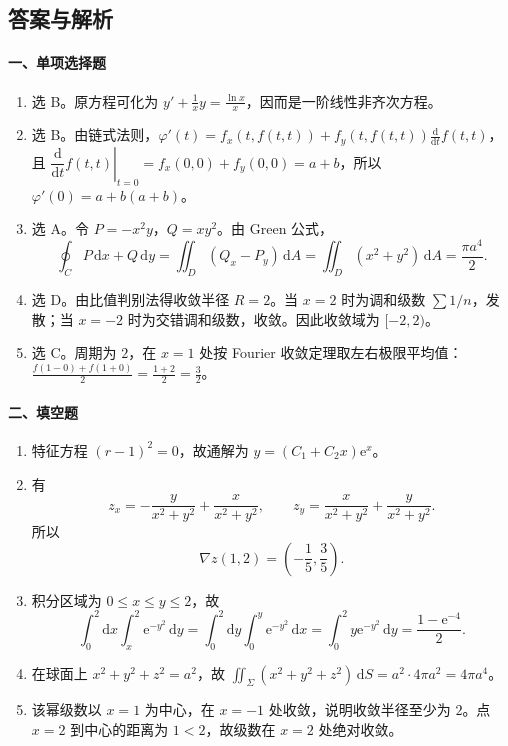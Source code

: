 \subsection{答案与解析}
\paragraph*{一、单项选择题}
\begin{enumerate}
  \item 选 B。原方程可化为 \(\displaystyle y'+\frac1x y=\frac{\ln x}{x}\)，因而是一阶线性非齐次方程。

  \item 选 B。由链式法则，\(\displaystyle \varphi'(t)=f_x(t,f(t,t))+f_y(t,f(t,t))\frac{\mathrm{d}}{\mathrm{d}t}f(t,t)\)，且 \(\left.\dfrac{\mathrm{d}}{\mathrm{d}t}f(t,t)\right|_{t=0}=f_x(0,0)+f_y(0,0)=a+b\)，所以
  \(\varphi'(0)=a+b(a+b)\)。

  \item 选 A。令 \(P=-x^2y\)，\(Q=xy^2\)。由 Green 公式，
  \[
    \oint_C P\,\mathrm{d}x+Q\,\mathrm{d}y
    =\iint_D(Q_x-P_y)\,\mathrm{d}A
    =\iint_D(x^2+y^2)\,\mathrm{d}A
    =\frac{\pi a^4}{2}.
  \]

  \item 选 D。由比值判别法得收敛半径 \(R=2\)。当 \(x=2\) 时为调和级数 \(\sum 1/n\)，发散；当 \(x=-2\) 时为交错调和级数，收敛。因此收敛域为 \([-2,2)\)。

  \item 选 C。周期为 \(2\)，在 \(x=1\) 处按 Fourier 收敛定理取左右极限平均值：\(\displaystyle \frac{f(1-0)+f(1+0)}2=\frac{1+2}{2}=\frac32\)。
\end{enumerate}

\paragraph*{二、填空题}
\begin{enumerate}
  \item 特征方程 \((r-1)^2=0\)，故通解为 \(\displaystyle y=(C_1+C_2x)\mathrm{e}^x\)。

  \item 有
  \[
    z_x=-\frac{y}{x^2+y^2}+\frac{x}{x^2+y^2},\qquad
    z_y=\frac{x}{x^2+y^2}+\frac{y}{x^2+y^2}.
  \]
  所以
  \[
    \nabla z(1,2)=\left(-\frac15,\frac35\right).
  \]

  \item 积分区域为 \(0\le x\le y\le 2\)，故
  \[
    \int_0^2\mathrm{d}x\int_x^2 \mathrm{e}^{-y^2}\,\mathrm{d}y
    =\int_0^2\mathrm{d}y\int_0^y \mathrm{e}^{-y^2}\,\mathrm{d}x
    =\int_0^2y\mathrm{e}^{-y^2}\,\mathrm{d}y
    =\frac{1-\mathrm{e}^{-4}}2.
  \]

  \item 在球面上 \(x^2+y^2+z^2=a^2\)，故 \(\displaystyle \iint_\Sigma (x^2+y^2+z^2)\,\mathrm{d}S=a^2\cdot 4\pi a^2=4\pi a^4\)。

  \item 该幂级数以 \(x=1\) 为中心，在 \(x=-1\) 处收敛，说明收敛半径至少为 \(2\)。点 \(x=2\) 到中心的距离为 \(1<2\)，故级数在 \(x=2\) 处绝对收敛。
\end{enumerate}

